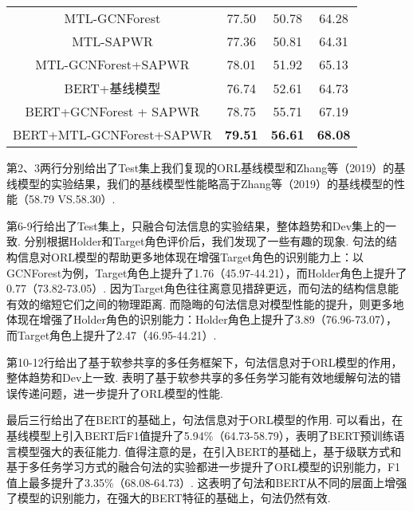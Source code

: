 \begin{table*}[hb!]
\begin{tabular}{c c c c }
        MTL-GCNForest                                             & 77.50          & 50.78          & 64.28          \\
        MTL-SAPWR                                                 & 77.36          & 50.81          & 64.31          \\
        MTL-GCNForest+SAPWR                                       & 78.01          & 51.92          & 65.13          \\
        \midrule
        BERT+基线模型                                             & 76.74          & 52.61          & 64.73          \\

        BERT+GCNForest + SAPWR                                    & 78.75          & 55.71          & 67.19          \\
        BERT+MTL-GCNForest+SAPWR                                  & \textbf{79.51} & \textbf{56.61} & \textbf{68.08} \\
        \bottomrule
    \end{tabular}

\end{table*}

第2、3两行分别给出了Test集上我们复现的ORL基线模型和Zhang等（2019）的基线模型的实验结果，我们的基线模型性能略高于Zhang等（2019）的基线模型的性能（58.79 VS.58.30）.

第6-9行给出了Test集上，只融合句法信息的实验结果，整体趋势和Dev集上的一致.
分别根据Holder和Target角色评价后，我们发现了一些有趣的现象.
句法的结构信息对ORL模型的帮助更多地体现在增强Target角色的识别能力上：以GCNForest为例，Target角色上提升了1.76（45.97-44.21），而Holder角色上提升了0.77（73.82-73.05）.
因为Target角色往往离意见措辞更远，而句法的结构信息能有效的缩短它们之间的物理距离.
而隐晦的句法信息对模型性能的提升，则更多地体现在增强了Holder角色的识别能力：Holder角色上提升了3.89（76.96-73.07），而Target角色上提升了2.47（46.95-44.21）.

第10-12行给出了基于软参共享的多任务框架下，句法信息对于ORL模型的作用，整体趋势和Dev上一致. 表明了基于软参共享的多任务学习能有效地缓解句法的错误传递问题，进一步提升了ORL模型的性能.

最后三行给出了在BERT的基础上，句法信息对于ORL模型的作用.
可以看出，在基线模型上引入BERT后F1值提升了5.94\%（64.73-58.79），表明了BERT预训练语言模型强大的表征能力.
值得注意的是，在引入BERT的基础上，基于级联方式和基于多任务学习方式的融合句法的实验都进一步提升了ORL模型的识别能力，F1值上最多提升了3.35\%（68.08-64.73）.
这表明了句法和BERT从不同的层面上增强了模型的识别能力，在强大的BERT特征的基础上，句法仍然有效.

